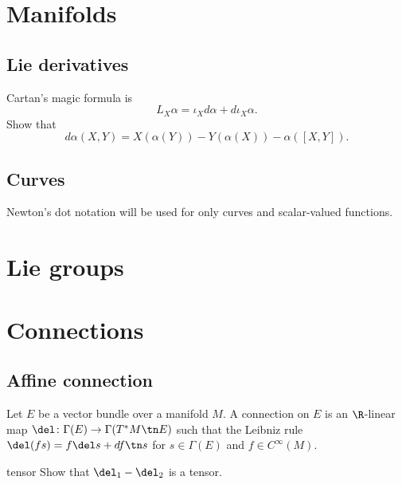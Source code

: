 \documentclass[11pt]{article}
\begin{document}
\maketitle
\tableofcontents

\section{Manifolds}
\subsection{Lie derivatives}

\begin{prb}
Cartan's magic formula is
\[L_X\alpha=\iota_Xd\alpha+d\iota_X\alpha.\]
\q Show that \[d\alpha(X,Y)=X(\alpha(Y))-Y(\alpha(X))-\alpha([X,Y]).\]
\end{prb}

\subsection{Curves}
\bigskip
Newton's dot notation will be used for only curves and scalar-valued functions.




\section{Lie groups}







\section{Connections}

\subsection{Affine connection}

\begin{prb}
Let $E$ be a vector bundle over a manifold $M$.
A connection on $E$ is an $\R$-linear map $\del\colon\Gamma(E)\to\Gamma(T^*M\tn E)$ such that the Leibniz rule $\del(fs)=f\del s+df\tn s$ for $s\in\Gamma(E)$ and $f\in C^\infty(M)$.
\end{prb}


\begin{prb}
tensor
\q Show that $\del_1-\del_2$ is a tensor.
\end{prb}
\end{document}
